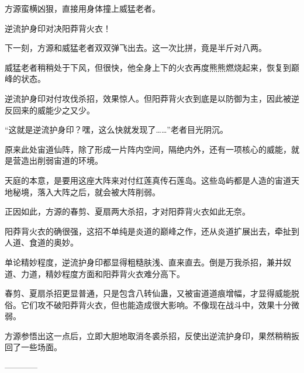 \begin{this_body}
方源蛮横凶狠，直接用身体撞上威猛老者。

逆流护身印对决阳莽背火衣！

下一刻，方源和威猛老者双双弹飞出去。这一次比拼，竟是半斤对八两。

威猛老者稍稍处于下风，但很快，他全身上下的火衣再度熊熊燃烧起来，恢复到巅峰的状态。

逆流护身印对付攻伐杀招，效果惊人。但阳莽背火衣到底是以防御为主，因此被逆反回来的威能少之又少。

“这就是逆流护身印？嘿，这么快就发现了……”老者目光阴沉。

原来此处宙道仙阵，除了形成一片阵内空间，隔绝内外，还有一项核心的威能，就是营造出削弱宙道的环境。

天庭的本意，是要用这座大阵来对付红莲真传石莲岛。这些岛屿都是人造的宙道天地秘境，落入大阵之后，就会被大阵削弱。

正因如此，方源的春剪、夏扇两大杀招，才对阳莽背火衣如此无奈。

阳莽背火衣的确很强，这招不单纯是炎道的巅峰之作，还从炎道扩展出去，牵扯到人道、食道的奥妙。

单论精妙程度，逆流护身印都显得粗糙肤浅、直来直去。倒是万我杀招，兼并奴道、力道，精妙程度方面和阳莽背火衣难分高下。

春剪、夏扇杀招更显普通，只是包含八转仙蛊，又被宙道道痕增幅，才显得威能脱俗。它们攻不破阳莽背火衣，但也能造成很大影响。不像现在战斗中，效果十分微弱。

方源参悟出这一点后，立即大胆地取消冬裘杀招，反使出逆流护身印，果然稍稍扳回了一些场面。

------------

\end{this_body}

